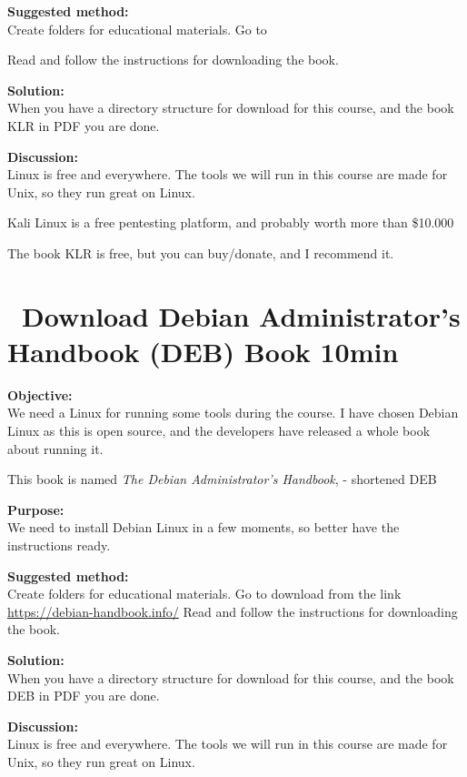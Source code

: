 \documentclass[a4paper,11pt,notitlepage]{report}
\begin{document}
{\bf Suggested method:}\\
Create folders for educational materials. Go to 

Read and follow the instructions for downloading the book.

{\bf Solution:}\\
When you have a directory structure for download for this course, and the book KLR in PDF you are done.

{\bf Discussion:}\\
Linux is free and everywhere. The tools we will run in this course are made for Unix, so they run great on Linux.

Kali Linux is a free pentesting platform, and probably worth more than \$10.000

The book KLR is free, but you can buy/donate, and I recommend it.



\chapter{\faExclamationTriangle\ Download Debian Administrator’s Handbook (DEB) Book 10min}
\label{ex:sw-downloadDEB}



{\bf Objective:}\\
We need a Linux for running some tools during the course. I have chosen Debian Linux as this is open source, and the developers have released a whole book about running it.

This book is named
\emph{The Debian Administrator’s Handbook},  - shortened DEB

{\bf Purpose:}\\
We need to install Debian Linux in a few moments, so better have the instructions ready.

{\bf Suggested method:}\\
Create folders for educational materials. Go to download from the link \url{https://debian-handbook.info/}
Read and follow the instructions for downloading the book.

{\bf Solution:}\\
When you have a directory structure for download for this course, and the book DEB in PDF you are done.

{\bf Discussion:}\\
Linux is free and everywhere. The tools we will run in this course are made for Unix, so they run great on Linux.
\end{document}
